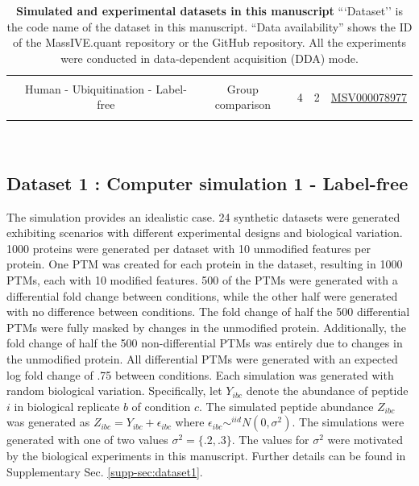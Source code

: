 \documentclass[mcp]{article}
\numberwithin{table}{section}
\begin{document}
\begin{table}[h!]
\begin{tiny}
\begin{tabular}{|c|c|ccc|c|}
&&&&& \\%
& Human - Ubiquitination - Label-free & Group comparison & 4 & 2 & \href{https://massive.ucsd.edu/ProteoSAFe/dataset.jsp?task=1b516164de5345108b40b75147dd58b5}{MSV000078977}\\ [0.02in]
 &&&&& \\
 \hline
\end{tabular}\\
\end{tiny}
\caption{ \small {\bf Simulated and experimental datasets in this manuscript} 
```Dataset'' is the code name of the dataset in this manuscript.
``Data availability'' shows the ID of the MassIVE.quant repository or the GitHub repository. All the experiments were conducted in data-dependent acquisition (DDA) mode.
}
\label{tab:dataDescription}
\end{table}

\subsection*{Dataset 1 : Computer simulation 1 - Label-free}
\label{sec:comp_sim_procedure1}

The simulation provides an idealistic case. 24 synthetic datasets were generated exhibiting scenarios with different experimental designs and biological variation. 1000 proteins were generated per dataset with 10 unmodified features per protein. One PTM was created for each protein in the dataset, resulting in 1000 PTMs, each with 10 modified features. 500 of the PTMs were generated with a differential fold change between conditions, while the other half were generated with no difference between conditions. The fold change of half the 500 differential PTMs were fully masked by changes in the unmodified protein. Additionally, the fold change of half the 500 non-differential PTMs was entirely due to changes in the unmodified protein. All differential PTMs were generated with an expected log fold change of .75 between conditions. Each simulation was generated with random biological variation. Specifically, let $Y_{ibc}$ denote the abundance of peptide $i$ in biological replicate $b$ of condition $c$. The simulated peptide abundance  $Z_{ibc}$ was generated as $Z_{ibc} = Y_{ibc} + \epsilon_{ibc}$ where $\epsilon_{ibc}\sim^{iid}N(0,\sigma^2)$. The simulations were generated with one of two values $\sigma^2 = \{.2, .3\}$. The values for $\sigma^2$ were motivated by the biological experiments in this manuscript.
Further details can be found in Supplementary Sec. \ref{supp-sec:dataset1}.
\end{document}
